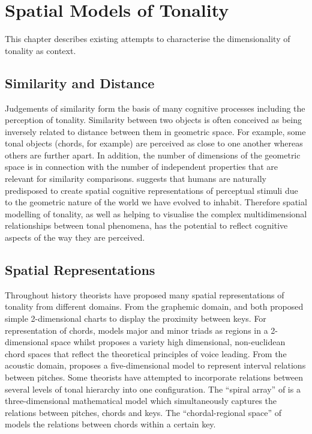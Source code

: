 \documentclass{article}
\begin{document}
\section{Spatial Models of Tonality}
\label{sec-5}

This chapter describes existing attempts to characterise the
dimensionality of tonality as context.
\subsection{Similarity and Distance}
\label{sec-5-1}

Judgements of similarity form the basis of many cognitive processes
including the perception of tonality. Similarity between two objects
is often conceived as being inversely related to distance between them
in geometric space. For example, some tonal objects (chords, for
example) are perceived as close to one another whereas others are
further apart. In addition, the number of dimensions of the geometric
space is in connection with the number of independent properties that
are relevant for similarity comparisons. \citet{Gardenfors1995}
suggests that humans are naturally predisposed to create spatial
cognitive representations of perceptual stimuli due to the geometric
nature of the world we have evolved to inhabit. Therefore spatial
modelling of tonality, as well as helping to visualise the complex
multidimensional relationships between tonal phenomena, has the
potential to reflect cognitive aspects of the way they are perceived.
\subsection{Spatial Representations}
\label{sec-5-2}

Throughout history theorists have proposed many spatial
representations of tonality from different domains. From the graphemic
domain, \citet{Weber} and \citet{Schoenberg} both proposed simple
2-dimensional charts to display the proximity between keys. For
representation of chords, \citet{Riemann} models major and minor
triads as regions in a 2-dimensional space whilst \citet{Tymoczko2011}
proposes a variety high dimensional, non-euclidean chord spaces that
reflect the theoretical principles of voice leading. From the acoustic
domain, \citet{Shepard1982} proposes a five-dimensional model to
represent interval relations between pitches. Some theorists have
attempted to incorporate relations between several levels of tonal
hierarchy into one configuration. The ``spiral array'' of
\citet{Chew2000a} is a three-dimensional mathematical model which
simultaneously captures the relations between pitches, chords and
keys. The ``chordal-regional space'' of \citet{Lerdahl2001a} models the
relations between chords within a certain key.
\end{document}
